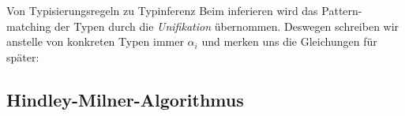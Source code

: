 \documentclass{beamer}
\begin{document}
\begin{frame}{Von Typisierungsregeln zu Typinferenz}
  Beim inferieren wird das Pattern-matching der Typen durch die \emph{Unifikation} übernommen.
  Deswegen schreiben wir anstelle von konkreten Typen immer $\alpha_i$ und merken uns die Gleichungen für später:



\end{frame}

\subsection{Hindley-Milner-Algorithmus}
\end{document}
